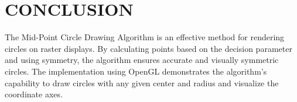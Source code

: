 \documentclass{article}
\begin{document}
\section*{CONCLUSION}
The Mid-Point Circle Drawing Algorithm is an effective method for rendering circles on raster displays. By calculating points based on the decision parameter and using symmetry, the algorithm ensures accurate and visually symmetric circles. The implementation using OpenGL demonstrates the algorithm's capability to draw circles with any given center and radius and visualize the coordinate axes.
\end{document}

